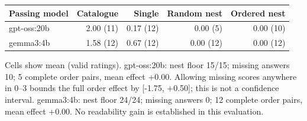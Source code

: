 \begin{center}\small
\begin{tabular}{lrrrr}\toprule
Passing model & Catalogue & Single & Random nest & Ordered nest \\\midrule
gpt-oss:20b & 2.00 (11) & 0.17 (12) & 0.00 (5) & 0.00 (10) \\
gemma3:4b & 1.58 (12) & 0.67 (12) & 0.00 (12) & 0.00 (12) \\
\bottomrule\end{tabular}
\end{center}
Cells show mean (valid ratings). gpt-oss:20b: nest floor 15/15; missing answers 10; 5 complete order pairs, mean effect +0.00. Allowing missing scores anywhere in 0--3 bounds the full order effect by [-1.75, +0.50]; this is not a confidence interval. gemma3:4b: nest floor 24/24; missing answers 0; 12 complete order pairs, mean effect +0.00. No readability gain is established in this evaluation.

